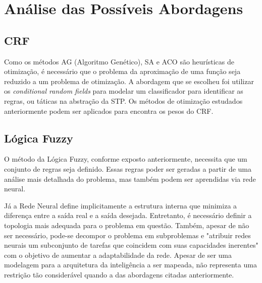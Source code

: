 \chapter{Análise das Possíveis Abordagens}\label{cap:anal_abordagens}


\section{CRF}

Como os métodos AG (Algoritmo Genético),
SA e ACO são heurísticas de otimização, é necessário que o problema da aproximação
de uma função seja reduzido a um problema de otimização. A abordagem que se escolheu
foi utilizar os \textit{conditional random fields} para modelar um classificador
para identificar as regras, ou táticas na abstração da STP\@. Os métodos de otimização
estudados anteriormente podem ser aplicados para encontra os pesos do CRF.

\section{Lógica Fuzzy}

O método da Lógica Fuzzy, conforme exposto anteriormente, necessita que um conjunto de regras seja definido.
Essas regras poder ser geradas a partir de uma análise mais detalhada do problema, mas também podem ser
aprendidas via rede neural.

Já a Rede Neural define implicitamente a estrutura interna
que minimiza a diferença entre a saída real e a saída desejada.
Entretanto, é necessário definir a topologia mais adequada para o
problema em questão. Também, apesar de não ser necessário, pode-se
decompor o problema em subproblemas e "atribuir redes neurais um
subconjunto de tarefas que coincidem com suas capacidades
inerentes" \cite[pag. 29]{haykin2001redes} com o objetivo de aumentar a
adaptabilidade da rede. Apesar de ser uma modelagem para a arquitetura
da inteligência a ser mapeada, não representa uma restrição tão
considerável quando a das abordagens citadas anteriormente.


